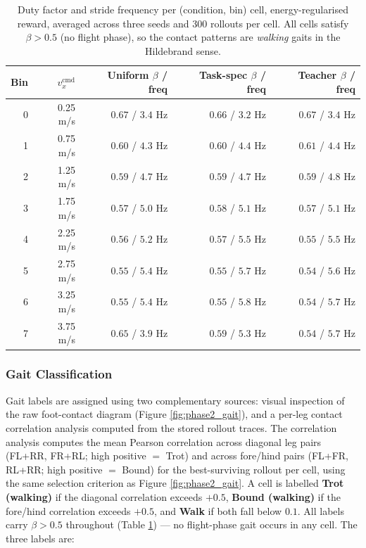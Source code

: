 \begin{table}[ht]
\centering
\begin{tabularx}{\textwidth}{@{}r r r r r@{}}
\toprule
\textbf{Bin} & $v_x^{\mathrm{cmd}}$ & \textbf{Uniform} $\beta$ / freq & \textbf{Task-spec} $\beta$ / freq & \textbf{Teacher} $\beta$ / freq \\
\midrule
0 & 0.25 m/s & $0.67$ / $3.4$ Hz & $0.66$ / $3.2$ Hz & $0.67$ / $3.4$ Hz \\
1 & 0.75 m/s & $0.60$ / $4.3$ Hz & $0.60$ / $4.4$ Hz & $0.61$ / $4.4$ Hz \\
2 & 1.25 m/s & $0.59$ / $4.7$ Hz & $0.59$ / $4.7$ Hz & $0.59$ / $4.8$ Hz \\
3 & 1.75 m/s & $0.57$ / $5.0$ Hz & $0.58$ / $5.1$ Hz & $0.57$ / $5.1$ Hz \\
4 & 2.25 m/s & $0.56$ / $5.2$ Hz & $0.57$ / $5.5$ Hz & $0.55$ / $5.5$ Hz \\
5 & 2.75 m/s & $0.55$ / $5.4$ Hz & $0.55$ / $5.7$ Hz & $0.54$ / $5.6$ Hz \\
6 & 3.25 m/s & $0.55$ / $5.4$ Hz & $0.55$ / $5.8$ Hz & $0.54$ / $5.7$ Hz \\
7 & 3.75 m/s & $0.65$ / $3.9$ Hz & $0.59$ / $5.3$ Hz & $0.54$ / $5.7$ Hz \\
\bottomrule
\end{tabularx}
\caption{Duty factor and stride frequency per (condition, bin) cell, energy-regularised reward, averaged across three seeds and 300 rollouts per cell. All cells satisfy $\beta > 0.5$ (no flight phase), so the contact patterns are \textit{walking} gaits in the Hildebrand sense.}
\label{tab:phase2_duty}
\end{table}

\subsubsection{Gait Classification}

Gait labels are assigned using two complementary sources: visual inspection of the raw foot-contact diagram (Figure \ref{fig:phase2_gait}), and a per-leg contact correlation analysis computed from the stored rollout traces. The correlation analysis computes the mean Pearson correlation across diagonal leg pairs (FL+RR, FR+RL; high positive $=$ Trot) and across fore/hind pairs (FL+FR, RL+RR; high positive $=$ Bound) for the best-surviving rollout per cell, using the same selection criterion as Figure \ref{fig:phase2_gait}. A cell is labelled \textbf{Trot (walking)} if the diagonal correlation exceeds $+0.5$, \textbf{Bound (walking)} if the fore/hind correlation exceeds $+0.5$, and \textbf{Walk} if both fall below $0.1$. All labels carry $\beta > 0.5$ throughout (Table \ref{tab:phase2_duty}) --- no flight-phase gait occurs in any cell. The three labels are:

